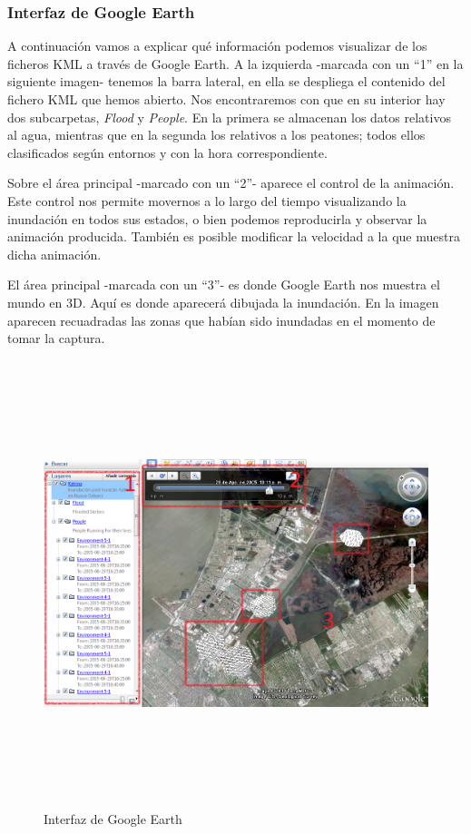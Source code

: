 \subsubsection{Interfaz de Google Earth}

A continuación vamos a explicar qué información podemos visualizar de los
ficheros KML a través de Google Earth. A la izquierda -marcada con un ``1'' en
la siguiente imagen- tenemos la barra lateral, en ella se despliega el
contenido del fichero KML que hemos abierto. Nos encontraremos con que en su
interior hay dos subcarpetas, {\em Flood} y {\em People}. En la primera se
almacenan los datos relativos al agua, mientras que en la segunda los relativos
a los peatones; todos ellos clasificados según entornos y con la hora
correspondiente.

Sobre el área principal -marcado con un ``2''- aparece el control de la
animación. Este control nos permite movernos a lo largo del tiempo visualizando
la inundación en todos sus estados, o bien podemos reproducirla y observar la
animación producida. También es posible modificar la velocidad a la que
muestra dicha animación.

El área principal -marcada con un ``3''- es donde Google Earth nos muestra el
mundo en 3D. Aquí es donde aparecerá dibujada la inundación. En la imagen
aparecen recuadradas las zonas que habían sido inundadas en el momento de tomar
la captura.

\begin{figure}[H]
 \centering
 \includegraphics[height=130mm,angle=90]{figuras/cap6/resultados/interfaz.png}
 \caption{Interfaz de Google Earth}
\end{figure}

